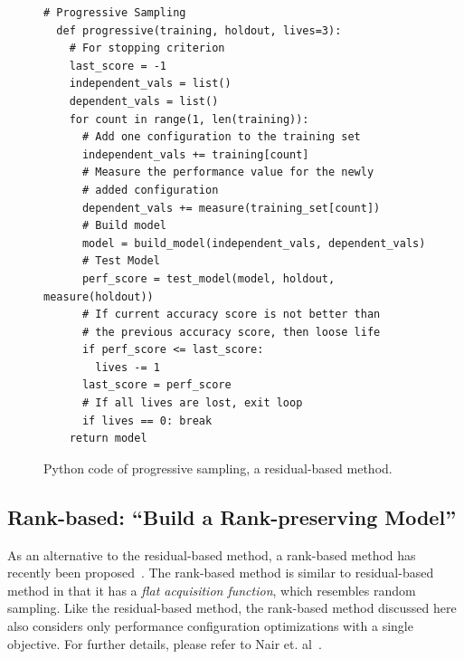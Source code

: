 \begin{figure}[t]
\small
\hspace{0.4cm}\begin{lstlisting}[xrightmargin=5.0ex,mathescape,frame=none,numbers=right]
  # Progressive Sampling
  def progressive(training, holdout, lives=3): 
    # For stopping criterion
    last_score = -1
    independent_vals = list()
    dependent_vals = list()
    for count in range(1, len(training)):    
      # Add one configuration to the training set
      independent_vals += training[count]      
      # Measure the performance value for the newly
      # added configuration 
      dependent_vals += measure(training_set[count])  
      # Build model
      model = build_model(independent_vals, dependent_vals)      
      # Test Model
      perf_score = test_model(model, holdout, measure(holdout))
      # If current accuracy score is not better than
      # the previous accuracy score, then loose life
      if perf_score <= last_score:
        lives -= 1
      last_score = perf_score
      # If all lives are lost, exit loop
      if lives == 0: break 
    return model
\end{lstlisting}
\caption{\small{Python code of progressive sampling, a residual-based method.}}
\label{fig:progressive_sampling_flash}  
\end{figure}



\subsection{Rank-based: ``Build a Rank-preserving Model''}
As an alternative to the residual-based method, a rank-based method has recently been proposed~\cite{nair2017using}. 
The rank-based method is similar to residual-based method in that it has a \textit{flat acquisition function}, which resembles random sampling. Like the residual-based method, the rank-based method discussed here also considers only performance configuration optimizations with a single objective. For further details, please refer to Nair et. al~\cite{nair2017using}.

